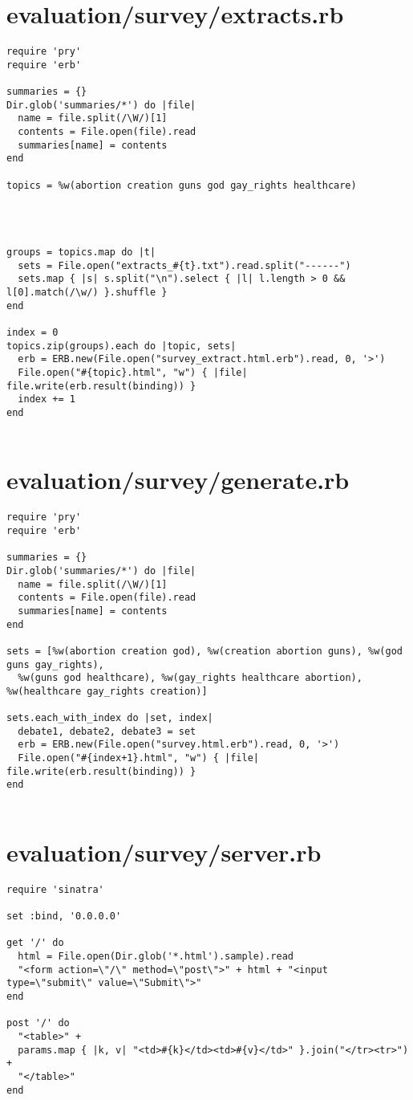 \documentclass{article}
\begin{document}
\section*{evaluation/survey/extracts.rb}
\begin{verbatim}
require 'pry'
require 'erb'

summaries = {}
Dir.glob('summaries/*') do |file|
  name = file.split(/\W/)[1]
  contents = File.open(file).read
  summaries[name] = contents
end

topics = %w(abortion creation guns god gay_rights healthcare)




groups = topics.map do |t|
  sets = File.open("extracts_#{t}.txt").read.split("------")
  sets.map { |s| s.split("\n").select { |l| l.length > 0 && l[0].match(/\w/) }.shuffle }
end

index = 0
topics.zip(groups).each do |topic, sets|
  erb = ERB.new(File.open("survey_extract.html.erb").read, 0, '>')
  File.open("#{topic}.html", "w") { |file| file.write(erb.result(binding)) }
  index += 1
end


\end{verbatim}
\pagebreak

\section*{evaluation/survey/generate.rb}
\begin{verbatim}
require 'pry'
require 'erb'

summaries = {}
Dir.glob('summaries/*') do |file|
  name = file.split(/\W/)[1]
  contents = File.open(file).read
  summaries[name] = contents
end

sets = [%w(abortion creation god), %w(creation abortion guns), %w(god guns gay_rights),
  %w(guns god healthcare), %w(gay_rights healthcare abortion), %w(healthcare gay_rights creation)]

sets.each_with_index do |set, index|
  debate1, debate2, debate3 = set
  erb = ERB.new(File.open("survey.html.erb").read, 0, '>')
  File.open("#{index+1}.html", "w") { |file| file.write(erb.result(binding)) }
end


\end{verbatim}
\pagebreak

\section*{evaluation/survey/server.rb}
\begin{verbatim}
require 'sinatra'

set :bind, '0.0.0.0'

get '/' do
  html = File.open(Dir.glob('*.html').sample).read
  "<form action=\"/\" method=\"post\">" + html + "<input type=\"submit\" value=\"Submit\">"
end

post '/' do
  "<table>" +
  params.map { |k, v| "<td>#{k}</td><td>#{v}</td>" }.join("</tr><tr>") +
  "</table>"
end


\end{verbatim}
\pagebreak
\end{document}
